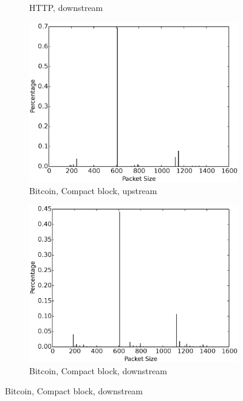 \begin{figure}[t]
\begin{subfigure}{0.48\linewidth}
\caption{HTTP, downstream}
\label{fig:tor_reg_traffic_pkt_size_downstream}
\end{subfigure} 
\begin{subfigure}{0.48\linewidth}
\centering
\includegraphics[width=\linewidth]{image/tor_compact_block_pkt_size_upstream.eps}
\caption{Bitcoin, Compact block, upstream}
\label{fig:tor_compact_block_pkt_size_upstream}
\end{subfigure}
\begin{subfigure}{0.48\linewidth}
\centering
\includegraphics[width=\linewidth]{image/tor_compact_block_pkt_size_downstream.eps}
\caption{Bitcoin, Compact block, downstream}
\label{fig:tor_compact_block_pkt_size_downstream}
\end{subfigure} 

\end{figure}
